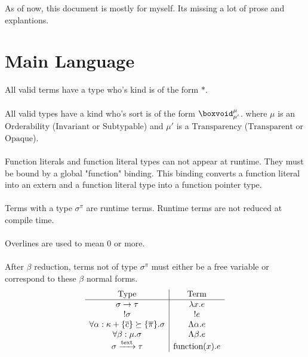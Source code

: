 \documentclass {article}
\begin{document}
As of now, this document is mostly for myself. Its missing a lot of prose and explantions. \\


\tableofcontents


\section{Main Language}

All valid terms have a type who's kind is of the form $ * $. \\
\\
All valid types have a kind who's sort is of the form $ \boxvoid^\mu_{\mu'} $.
where $ \mu $ is an $ \text{Orderability} $ ($\text{Invariant} $ or $ \text{Subtypable}$)
and $ \mu' $ is a $ \text{Transparency}$ ($\text{Transparent}$ or $\text{Opaque}$). \\
\\
Function literals and function literal types can not appear at runtime. They must be bound by a global "function" binding.
This binding converts a function literal into an extern and a function literal type into a function pointer type. \\
\\
Terms with a type $ \sigma^\pi $ are runtime terms.
Runtime terms are not reduced at compile time. \\
\\
Overlines are used to mean 0 or more. \\
\\
After $ \beta $ reduction, terms not of type $ \sigma^\pi $ must either be a free variable or correspond to these $ \beta $ normal forms. \\
\begin{gather*}
\begin{array}{c | c}
\text{Type} & \text{Term} \\
\hline
\sigma \to \tau & \lambda x. e \\
!\sigma & !e \\
\forall \alpha : \kappa + \{ \overline c \} \succeq \{ \overline \pi \}. \sigma & \Lambda \alpha. e  \\
\forall \beta : \mu. \sigma & \Lambda \beta. e \\
\sigma \xrightarrow{\text{text}} \tau & \text{function}(x). e \\
\end{array}
\\
\end{gather*}
\end{document}
